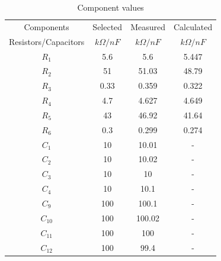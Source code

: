 \begin{table}[ht!]
\centering
\begin{tabular}{|c|c||c||c|}
    \hline
    Components & Selected & Measured & Calculated \\
    Resistors/Capacitors & $k\Omega / nF$ & $k\Omega / nF$ & $k\Omega / nF$ \\
    \hline\hline
    $R_1$ & 5.6 & 5.6 & 5.447 \\
    \hline
    $R_2$ & 51 & 51.03 & 48.79 \\
    \hline
    $R_3$ & 0.33 & 0.359 & 0.322 \\
    \hline
    $R_4$ & 4.7 & 4.627 & 4.649 \\
    \hline
    $R_5$ & 43 & 46.92 & 41.64 \\
    \hline
    $R_6$ & 0.3 & 0.299 & 0.274 \\
    \hline
    $C_1$ & 10 & 10.01 & - \\
    \hline
    $C_2$ & 10 & 10.02 & - \\
    \hline
    $C_3$ & 10 & 10 & - \\
    \hline
    $C_4$ & 10 & 10.1 & - \\
    \hline
    $C_9$ & 100 & 100.1 & - \\
    \hline
    $C_{10}$ & 100 & 100.02 & - \\
    \hline
    $C_{11}$ & 100 & 100 & - \\
    \hline
    $C_{12}$ & 100 & 99.4 & - \\
    \hline
\end{tabular}
\captionsetup{justification=centering,singlelinecheck=true}
\caption{Component values}
\label{tab:components}
\end{table}